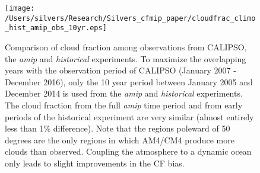 \documentclass[draft]{agujournal2019}
\begin{document}
\begin{figure}
  \centering
  \texttt{[image: /Users/silvers/Research/Silvers\_cfmip\_paper/cloudfrac\_climo\_hist\_amip\_obs\_10yr.eps]}
  \caption{Comparison of cloud fraction among observations from CALIPSO, the \textit{amip} and 
  \textit{historical} experiments.  To maximize the overlapping years with the observation period of CALIPSO
  (January 2007 - December 2016), only the 10 year period between January 2005 and December 2014 is
  used from the \textit{amip} and  \textit{historical} experiments.  The cloud fraction from the full \textit{amip}
  time period and from early periods of the historical experiment are very similar 
  (almost entirely less than 1\% difference).   Note that the regions poleward of
  50 degrees are the only regions in which AM4/CM4 produce more clouds than observed.  
  Coupling the atmosphere to a dynamic ocean only leads to slight improvements in the CF bias.}
  \label{fig:calipso_amip_historical}
\end{figure}
\end{document}

